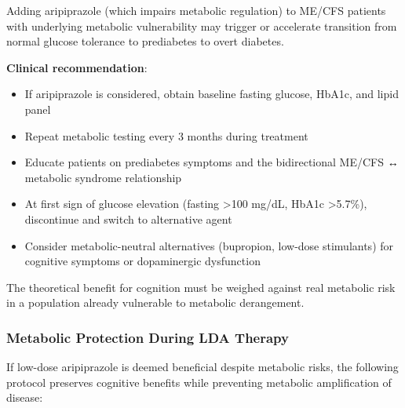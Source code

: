 \begin{warning}
Adding aripiprazole (which impairs metabolic regulation) to ME/CFS patients with underlying metabolic vulnerability may trigger or accelerate transition from normal glucose tolerance to prediabetes to overt diabetes.

\textbf{Clinical recommendation}:
\begin{itemize}
    \item If aripiprazole is considered, obtain baseline fasting glucose, HbA1c, and lipid panel
    \item Repeat metabolic testing every 3 months during treatment
    \item Educate patients on prediabetes symptoms and the bidirectional ME/CFS ↔ metabolic syndrome relationship
    \item At first sign of glucose elevation (fasting >100 mg/dL, HbA1c >5.7\%), discontinue and switch to alternative agent
    \item Consider metabolic-neutral alternatives (bupropion, low-dose stimulants) for cognitive symptoms or dopaminergic dysfunction
\end{itemize}

The theoretical benefit for cognition must be weighed against real metabolic risk in a population already vulnerable to metabolic derangement.
\end{warning}

\subsubsection{Metabolic Protection During LDA Therapy}

If low-dose aripiprazole is deemed beneficial despite metabolic risks, the following protocol preserves cognitive benefits while preventing metabolic amplification of disease:

